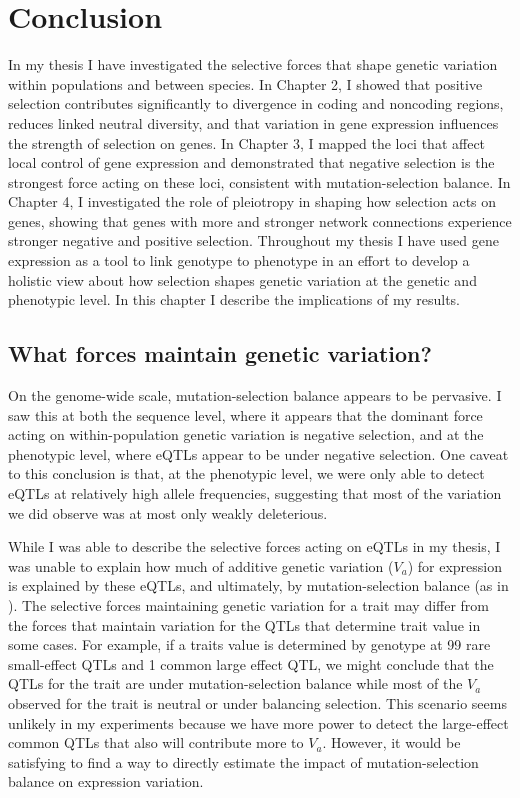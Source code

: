 \setlength{\parindent}{0ex}
\setlength{\parskip}{2ex}

\chapter{Conclusion}

In my thesis I have investigated the selective forces that shape genetic variation within populations and between species. In Chapter 2, I showed that positive selection contributes significantly to divergence in coding and noncoding regions, reduces linked neutral diversity, and that variation in gene expression influences the strength of selection on genes. In Chapter 3, I mapped the loci that affect local control of gene expression and demonstrated that negative selection is the strongest force acting on these loci, consistent with mutation-selection balance. In Chapter 4, I investigated the role of pleiotropy in shaping how selection acts on genes, showing that genes with more and stronger network connections experience stronger negative and positive selection. Throughout my thesis I have used gene expression as a tool to link genotype to phenotype in an effort to develop a holistic view about how selection shapes genetic variation at the genetic and phenotypic level. In this chapter I describe the implications of my results.

\section{What forces maintain genetic variation?}

On the genome-wide scale, mutation-selection balance appears to be pervasive. I saw this at both the sequence level, where it appears that the dominant force acting on within-population genetic variation is negative selection, and at the phenotypic level, where eQTLs appear to be under negative selection. One caveat to this conclusion is that, at the phenotypic level, we were only able to detect eQTLs at relatively high allele frequencies, suggesting that most of the variation we did observe was at most only weakly deleterious.

While I was able to describe the selective forces acting on eQTLs in my thesis, I was unable to explain how much of additive genetic variation ($V_{a}$) for expression is explained by these eQTLs, and ultimately, by mutation-selection balance (as in \citealt{monnahan2015}). The selective forces maintaining genetic variation for a trait may differ from the forces that maintain variation for the QTLs that determine trait value in some cases. For example, if a trait\textsc{}s value is determined by genotype at 99 rare small-effect QTLs and 1 common large effect QTL, we might conclude that the QTLs for the trait are under mutation-selection balance while most of the $V_{a}$ observed for the trait is neutral or under balancing selection. This scenario seems unlikely in my experiments because we have more power to detect the large-effect common QTLs that also will contribute more to $V_{a}$. However, it would be satisfying to find a way to directly estimate the impact of mutation-selection balance on expression variation.

